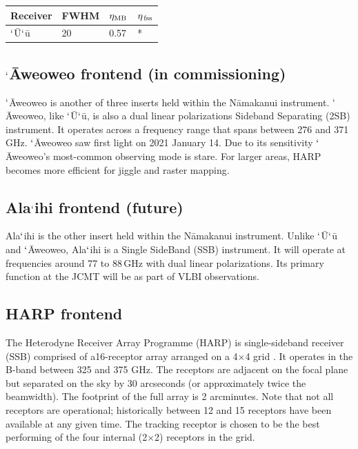 \documentclass[11pt,oneside,chapters]{starlink}
\newcommand{\uarcs}{\hspace{-0.27em}\arcsec\hspace{-0.07em}}
\newcommand{\uarcs}{$''$}
\begin{document}
\begin{table}[h!]
\begin{center}
\begin{tabular}{|p{1.5cm}|p{1.2cm}|p{0.8cm}|p{0.8cm}|}
\hline
Receiver &FWHM & $\eta_{\textnormal{MB}}$ & $\eta_{\textnormal{\,fss}}$\\
\hline
$`$\=U$`$\=u&20\uarcs&0.57 & *\\
\hline
\end{tabular}
\end{center}
\end{table}


\subsection{$`$\=Aweoweo frontend (in commissioning)}

$`$\=Aweoweo is another of three inserts held within the N\=amakanui
instrument. $`$\=Aweoweo, like $`$\=U$`$\=u, is also a dual linear
polarizations Sideband Separating (2SB) instrument. It operates across
a frequency range that spans between 276 and 371\,GHz. $`$\=Aweoweo
saw first light on 2021 January 14.  Due to its sensitivity
$`$\=Aweoweo's most-common observing mode is stare. For larger areas,
HARP becomes more efficient for jiggle and raster mapping.

\subsection{Ala$`$ihi frontend (future)}

Ala$`$ihi is the other insert held within the N\=amakanui instrument.
Unlike $`$\=U$`$\=u and $`$\=Aweoweo, Ala$`$ihi is a Single SideBand
(SSB) instrument. It will operate at frequencies around 77 to 88\,GHz
with dual linear polarizations. Its primary function at the JCMT will
be as part of VLBI observations.


\subsection{HARP frontend}

The Heterodyne Receiver Array Programme (HARP) is single-sideband
receiver (SSB) comprised of a16-receptor array
arranged on a 4$\times$4 grid \cite{harp}. It operates in the B-band
between 325 and 375 GHz. The receptors are adjacent on the focal plane
but separated on the sky by 30 arcseconds (or approximately twice the
beamwidth). The footprint of the full array is 2 arcminutes.  Note
that not all receptors are operational; historically between 12 and 15
receptors have been available at any given time. The tracking receptor
is chosen to be the best performing of the four internal (2$\times$2)
receptors in the grid.
\end{document}
